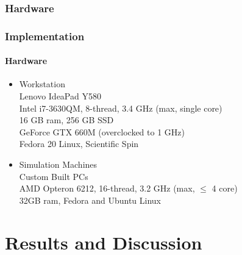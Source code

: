 \documentclass{beamer}
\begin{document}
  \subsubsection*{Hardware}
  \begin{frame}
    \frametitle{Implementation}
    \framesubtitle{Hardware}
    \begin{itemize}
    	\item Workstation\\
    				Lenovo IdeaPad Y580 \\
    				Intel i7-3630QM,  8-thread, 3.4 GHz (max, single core) \\
    				16 GB ram, 256 GB SSD \\
    				GeForce GTX 660M (overclocked to 1 GHz) \\
    				Fedora 20 Linux, Scientific Spin
    	\item Simulation Machines\\
    				Custom Built PCs \\
    				AMD Opteron 6212, 16-thread, 3.2 GHz (max, $\le$ 4 core) \\
    				32GB ram, Fedora and Ubuntu Linux
    \end{itemize}
  \end{frame}
    
  \section{Results and Discussion}
\end{document}

